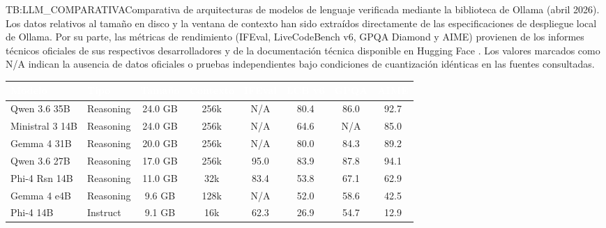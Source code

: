 \begin{table}[Comparativa técnica de LLMs en Ollama (Auditoría Final)]{TB:LLM_COMPARATIVA}{Comparativa de arquitecturas de modelos de lenguaje verificada mediante la biblioteca de Ollama (abril 2026). Los datos relativos al tamaño en disco y la ventana de contexto han sido extraídos directamente de las especificaciones de despliegue local de Ollama. Por su parte, las métricas de rendimiento (IFEval, LiveCodeBench v6, GPQA Diamond y AIME) provienen de los informes técnicos oficiales de sus respectivos desarrolladores y de la documentación técnica disponible en Hugging Face \cite{meta2024llama32, gemma_2025, deepseekai2025deepseekr1, qwen3.5, qwen3.6-27b, qwen36_35b_a3b, microsoft2025phi4, microsoft2025phi4mini, huggingface_hub}. Los valores marcados como N/A indican la ausencia de datos oficiales o pruebas independientes bajo condiciones de cuantización idénticas en las fuentes consultadas.}
  \centering
  \begingroup
  \setlength{\arrayrulewidth}{1pt}
  \begin{tabular}{|l|l|c|c|c|c|c|c|}
    \hline
    \rowcolor{maincolor} %
    \textcolor{white}{\textbf{Modelo}} & \textcolor{white}{\textbf{Tipo}} & \textcolor{white}{\textbf{Tamaño}} & \textcolor{white}{\textbf{Contexto}} & \textcolor{white}{\textbf{IFEval}} & \textcolor{white}{\textbf{LCB v6}} & \textcolor{white}{\textbf{GPQA}} & \textcolor{white}{\textbf{AIME}} \\
    \hline
    \rowcolor{ulepsbased} Qwen 3.6 35B          & Reasoning & 24.0 GB & 256k & N/A     & 80.4 & 86.0 & 92.7 \\ \hline
    Ministral 3 14B       & Reasoning & 24.0 GB & 256k & N/A     & 64.6 & N/A  & 85.0 \\ \hline
    \rowcolor{ulepsbased} Gemma 4 31B           & Reasoning & 20.0 GB & 256k & N/A     & 80.0 & 84.3 & 89.2 \\ \hline
    Qwen 3.6 27B          & Reasoning & 17.0 GB & 256k & 95.0    & 83.9 & 87.8 & 94.1 \\ \hline
    \rowcolor{ulepsbased} Phi-4 Rsn 14B         & Reasoning & 11.0 GB & 32k  & 83.4    & 53.8 & 67.1 & 62.9 \\ \hline
    Gemma 4 e4B           & Reasoning & 9.6 GB  & 128k & N/A     & 52.0 & 58.6 & 42.5 \\ \hline
    \rowcolor{ulepsbased} Phi-4 14B             & Instruct  & 9.1 GB  & 16k  & 62.3    & 26.9 & 54.7 & 12.9 \\ \hline

\end{tabular}
\end{table}
